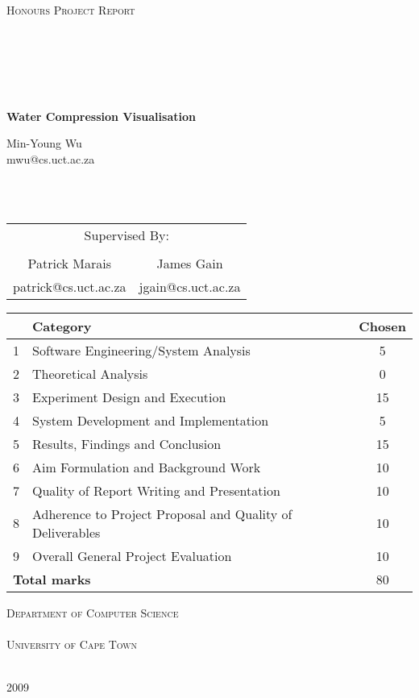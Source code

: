\documentclass[a4paper]{report}
\begin{document}
\begin{titlepage}
\begin{center}

\textsc{\Large Honours Project Report \\
\ \\
\ \\
\ \\
\ \\
\ \\
}

{\huge \bfseries
Water Compression Visualisation
\\}

\vfill

\large Min-Young Wu
\\
\small{mwu@cs.uct.ac.za}

\ \\
\ \\

\begin{tabular}{cc}
  \multicolumn{2}{c}{\large Supervised By:} \\
  \\
  \large Patrick Marais & \large James Gain
  \\
  \small patrick@cs.uct.ac.za & \small jgain@cs.uct.ac.za
\end{tabular}

\vfill

\begin{tabular}{|l|l|c|}
  \hline
  & \textbf{Category} & \textbf{Chosen} \\
  \hline
  1 & Software Engineering/System Analysis & 5 \\
  \hline
  2 & Theoretical Analysis & 0 \\
  \hline
  3 & Experiment Design and Execution & 15 \\
  \hline
  4 & System Development and Implementation & 5 \\
  \hline
  5 & Results, Findings and Conclusion & 15 \\
  \hline
  6 & Aim Formulation and Background Work & 10 \\
  \hline
  7 & Quality of Report Writing and Presentation & 10 \\
  \hline
  8 & Adherence to Project Proposal and Quality of Deliverables & 10 \\
  \hline
  9 & Overall General Project Evaluation & 10 \\
  \hline
  \multicolumn{2}{|l|}{\textbf{Total marks}} & 80 \\
  \hline
\end{tabular}

\vfill

\textsc{\Large Department of Computer Science \\
\ \\
University of Cape Town \\
\ \\}

{\large 2009}

\end{center}
\end{titlepage}
\end{document}
